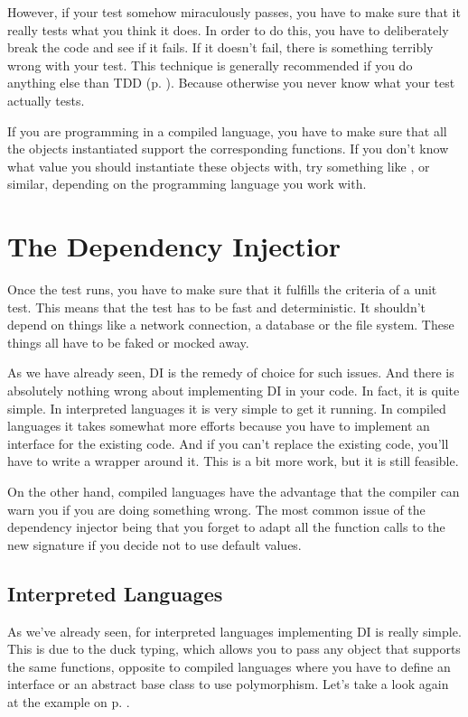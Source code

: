However, if your test somehow miraculously passes, you have to make sure that it really tests what you think it does. In order to do this, you have to deliberately break the code and see if it fails. If it doesn't fail, there is something terribly wrong with your test. This technique is generally recommended if you do anything else than TDD (p. \pageref{chap:tdd}). Because otherwise you never know what your test actually tests.

If you are programming in a compiled language, you have to make sure that all the objects instantiated support the corresponding functions. If you don't know what value you should instantiate these objects with, try something like ,  or similar, depending on the programming language you work with.

\section{The Dependency Injectior}\label{sec:dependency_injector}

Once the test runs, you have to make sure that it fulfills the criteria of a unit test. This means that the test has to be fast and deterministic. It shouldn't depend on things like a network connection, a database or the file system. These things all have to be faked or mocked away.

As we have already seen, DI is the remedy of choice for such issues. And there is absolutely nothing wrong about implementing DI in your code. In fact, it is quite simple. In interpreted languages it is very simple to get it running. In compiled languages it takes somewhat more efforts because you have to implement an interface for the existing code. And if you can't replace the existing code, you'll have to write a wrapper around it. This is a bit more work, but it is still feasible. 

On the other hand, compiled languages have the advantage that the compiler can warn you if you are doing something wrong. The most common issue of the dependency injector being that you forget to adapt all the function calls to the new signature if you decide not to use default values.

\subsection{Interpreted Languages}

As we've already seen, for interpreted languages implementing DI is really simple. This is due to the duck typing, which allows you to pass any object that supports the same functions, opposite to compiled languages where you have to define an interface or an abstract base class to use polymorphism. Let's take a look again at the example on p. \pageref{prog:average_of_file}.


